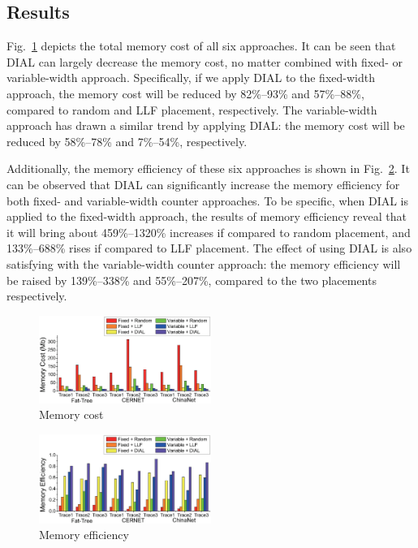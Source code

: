 \subsection{Results}
Fig.~\ref{fig:memory-cost} depicts the total memory cost of all six approaches.
It can be seen that DIAL can largely decrease the memory cost, no matter combined with fixed- or variable-width approach.
Specifically, if we apply DIAL to the fixed-width approach, the memory cost will be reduced by 82\%--93\% and 57\%--88\%, compared to random and LLF placement, respectively.
The variable-width approach has drawn a similar trend by applying DIAL:
the memory cost will be reduced by 58\%--78\% and 7\%--54\%, respectively.

Additionally, the memory efficiency of these six approaches is shown in Fig.~\ref{fig:memory-efficiency}.
It can be observed that DIAL can significantly increase the memory efficiency for both fixed- and variable-width counter approaches.
To be specific, when DIAL is applied to the fixed-width approach, the results of memory efficiency reveal that it will bring about 459\%--1320\% increases if compared to random placement, and 133\%--688\% rises if compared to LLF placement.
The effect of using DIAL is also satisfying with the variable-width counter approach:
the memory efficiency will be raised by 139\%--338\% and 55\%--207\%, compared to the two placements respectively.

\begin{figure}[t]
\centering
\vspace{-0.2in}
\includegraphics[width=0.5\textwidth]{data/cost}
\vspace{-0.4in}
\caption{Memory cost}
\label{fig:memory-cost}
\vspace{-0.2in}
\end{figure}

\begin{figure}[t]
\centering
\includegraphics[width=0.5\textwidth]{data/efficiency}
\vspace{-0.4in}
\caption{Memory efficiency}
\label{fig:memory-efficiency}
\vspace{-0.2in}
\end{figure}

